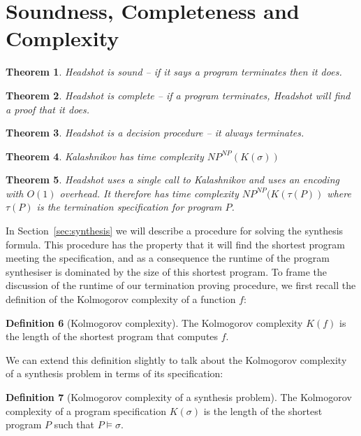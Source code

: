 \documentclass[preprint]{sigplanconf}
\newtheorem{theorem}{Theorem}
\theoremstyle{definition}
\newtheorem{definition}[theorem]{Definition}
\begin{document}
\section{Soundness, Completeness and Complexity}
\begin{theorem}
 {\sc Headshot} is sound -- if it says a program terminates then it does.
\end{theorem}

\begin{theorem}
 {\sc Headshot} is complete -- if a program terminates, {\sc Headshot} will find a proof that it does.
\end{theorem}

\begin{theorem}
 {\sc Headshot} is a decision procedure -- it always terminates.
\end{theorem}

\begin{theorem}
 {\sc Kalashnikov} has time complexity $NP^{NP}(K(\sigma))$
\end{theorem}

\begin{theorem}
 {\sc Headshot} uses a single call to {\sc Kalashnikov} and uses an encoding with $O(1)$
 overhead.  It therefore has time complexity $NP^{NP}(K(\tau(P))$ where $\tau(P)$ is the
 termination specification for program $P$.
\end{theorem}




In Section~\ref{sec:synthesis} we will describe a procedure for solving the synthesis formula.
This procedure has the property that it will find the shortest program meeting the
specification, and as a consequence the runtime of the program synthesiser is dominated
by the size of this shortest program.  To frame the discussion of the runtime of our
termination proving procedure, we first recall the definition of the Kolmogorov complexity
of a function $f$:

\begin{definition}[Kolmogorov complexity]
 The Kolmogorov complexity $K(f)$ is the length of the shortest program that
 computes $f$.
\end{definition}

We can extend this definition slightly to talk about the Kolmogorov complexity of a
synthesis problem in terms of its specification:

\begin{definition}[Kolmogorov complexity of a synthesis problem]
 The Kolmogorov complexity of a program specification $K(\sigma)$ is the length of the shortest
 program $P$ such that $P \models \sigma$.
\end{definition}
\end{document}
